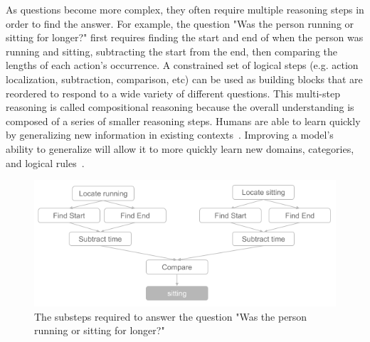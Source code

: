 \documentclass[10pt,twocolumn,letterpaper]{article}
\begin{document}
As questions become more complex, they often require multiple reasoning steps in order to find the answer. For example, the question "Was the person running or sitting for longer?" first requires finding the start and end of when the person was running and sitting, subtracting the start from the end, then comparing the lengths of each action's occurrence. A constrained set of logical steps (e.g. action localization, subtraction, comparison, etc) can be used as building blocks that are reordered to respond to a wide variety of different questions. This multi-step reasoning is called compositional reasoning because the overall understanding is composed of a series of smaller reasoning steps. Humans are able to learn quickly by generalizing new information in existing contexts~\cite{tani2014self,schulz2016probing}. Improving a model's ability to generalize will allow it to more quickly learn new domains, categories, and logical rules~\cite{lake2018generalization,vatashsky2020vqa}. 


\begin{figure}[t]
\begin{center}
\includegraphics[width=0.8\linewidth]{Figures/figure_composition.png}
\end{center}
   \caption{The substeps required to answer the question "Was the person running or sitting for longer?"}
\label{compositional_substeps}
\end{figure}
\end{document}
